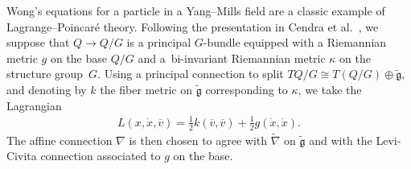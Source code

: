 \documentclass[10pt,a4paper]{amsart}
\numberwithin{equation}{section}
\begin{document}
\begin{Example} Wong's equations \cite{Wong1970} for a particle in a Yang--Mills f\/ield are a classic example of Lagrange--Poincar\'e theory. Following the presentation in Cendra et al.~\cite[Chapter~4]{CeMaRa2001}, we suppose that $ Q \rightarrow Q / G $ is a principal $G$-bundle equipped with a Riemannian metric $g$ on the base $ Q / G $ and a~bi-invariant Riemannian metric $\kappa$ on the structure group~$G$. Using a principal connection to split
 $ T Q / G \cong T ( Q / G ) \oplus \widetilde{ \mathfrak{g} } $, and denoting by $k$ the f\/iber metric on $ \widetilde{ \mathfrak{g} } $ corresponding to $\kappa$, we take the Lagrangian
 \begin{gather*}
 L ( x, \dot{x}, \overline{ v } ) = \frac{1}{2} k ( \overline{ v} , \overline{ v } ) + \frac{1}{2} g ( \dot{x} , \dot{x} ) .
 \end{gather*}
The af\/f\/ine connection $ \nabla $ is then chosen to agree with $ \widetilde{ \nabla } $ on $ \widetilde{ \mathfrak{g} } $ and with the Levi-Civita connection associated to $g$ on the base.


\end{Example}
\end{document}
